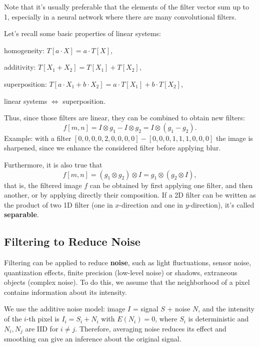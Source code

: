 Note that it's usually preferable that the elements of the filter vector sum up to 1, especially in a neural network where there are many convolutional filters.

Let's recall some basic properties of linear systems:
\begin{myitem}
    \item homogeneity: $T[a \cdot X] = a \cdot T[X]$,
    \item additivity: $T[X_1 + X_2 ] = T[X_1] + T[X_2]$,
    \item superposition: $T[a \cdot X_1 + b \cdot X_2 ] = a \cdot T[X_1] + b \cdot T[X_2]$,
    \item linear systems $\Longleftrightarrow$ superposition.
\end{myitem}

Thus, since those filters are linear, they can be combined to obtain new filters:
\begin{equation}\label{eq:conv-combined}
    f[m,n] = I \otimes g_1 - I \otimes g_2 = I \otimes \left(g_1 - g_2\right).
\end{equation}
Example: with a filter $[0,0,0,0,2,0,0,0,0] - [0,0,0,1,1,1,0,0,0]$ the image is sharpened, since we enhance the considered filter before applying blur.

Furthermore, it is also true that
\begin{equation}\label{eq:conv-separable}
    f[m,n] = \left(g_1 \otimes g_2\right) \otimes I = g_1 \otimes \left(g_2 \otimes I\right),
\end{equation}
that is, the filtered image $f$ can be obtained by first applying one filter, and then another, or by applying directly their composition. If a 2D filter can be written as the product of two 1D filter (one in $x$-direction and one in $y$-direction), it's called \textbf{separable}.


\subsection{Filtering to Reduce Noise}\label{sec:bif-noise}

Filtering can be applied to reduce \textbf{noise}, such as light fluctuations, sensor noise, quantization effects, finite precision (low-level noise) or shadows, extraneous objects (complex noise). To do this, we assume that the neighborhood of a pixel contains information about its intensity.

We use the additive noise model: image $I$ = signal $S$ + noise $N$, and the intensity of the $i$-th pixel is $I_i = S_i + N_i$ with $E(N_i) = 0$, where $S_i$ is deterministic and $N_i, N_j$ are IID for $i \neq j$. Therefore, averaging noise reduces its effect and smoothing can give an inference about the original signal.\label{noise-iid}

